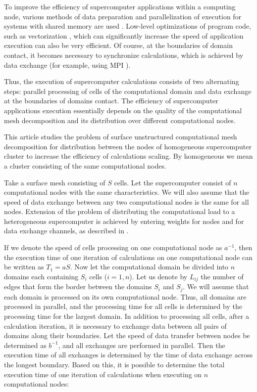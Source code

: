 \documentclass[
11pt,%
tightenlines,%
twoside,%
onecolumn,%
nofloats,%
nobibnotes,%
nofootinbib,%
superscriptaddress,%
noshowpacs,%
centertags]%
{revtex4}
\begin{document}
To improve the efficiency of supercomputer applications within a computing node, various methods of data preparation and parallelization of execution for systems with shared memory are used \cite{Dorris_OpenMP}.
Low-level optimizations of program code, such as vectorization \cite{Shabanov_Vec}, which can significantly increase the speed of application execution can also be very efficient.
Of course, at the boundaries of domain contact, it becomes necessary to synchronize calculations, which is achieved by data exchange (for example, using MPI \cite{Kalantzis_MPI}).

Thus, the execution of supercomputer calculations consists of two alternating steps: parallel processing of cells of the computational domain and data exchange at the boundaries of domains contact.
The efficiency of supercomputer applications execution essentially depends on the quality of the computational mesh decomposition and its distribution over different computational nodes.

This article studies the problem of surface unstructured computational mesh decomposition for distribution between the nodes of homogeneous supercomputer cluster to increase the efficiency of calculations scaling.
By homogeneous we mean a cluster consisting of the same computational nodes.

Take a surface mesh consisting of $ S $ cells.
Let the supercomputer consist of $ n $ computational nodes with the same characteristics.
We will also assume that the speed of data exchange between any two computational nodes is the same for all nodes.
Extension of the problem of distributing the computational load to a heterogeneous supercomputer is achieved by entering weights for nodes and for data exchange channels, as described in \cite{Rybakov_Heterogenous}.

If we denote the speed of cells processing on one computational node as $ a^{-1} $, then the execution time of one iteration of calculations on one computational node can be written as $ T_1 = aS $.
Now let the computational domain be divided into $ n $ domains each containing $ S_i $ cells ($ i = 1, n $).
Let us denote by $ L_{ij} $ the number of edges that form the border between the domains $ S_i $ and $ S_j $.
We will assume that each domain is processed on its own computational node.
Thus, all domains are processed in parallel, and the processing time for all cells is determined by the processing time for the largest domain.
In addition to processing all cells, after a calculation iteration, it is necessary to exchange data between all pairs of domains along their boundaries.
Let the speed of data transfer between nodes be determined as $ b^{-1} $, and all exchanges are performed in parallel.
Then the execution time of all exchanges is determined by the time of data exchange across the longest boundary.
Based on this, it is possible to determine the total execution time of one iteration of calculations when executing on $ n $ computational nodes:
\end{document}
